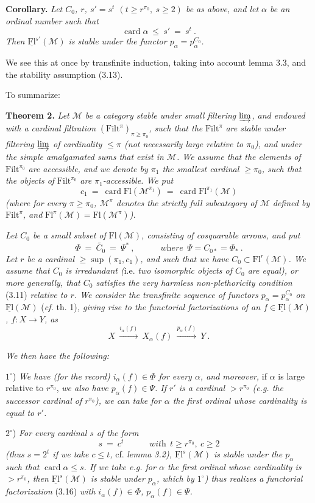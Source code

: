 \documentclass[11pt]{article}
\newcommand{\msp}[1]{\marginpar{\footnotesize [#1]}}
\newcommand{\M}{\mathcal{M}}
\newcommand{\Filt}{\mathrm{Filt}}
\newcommand{\Fl}{\mathrm{Fl}}
\newcommand{\uFl}{\underline{\mathrm{Fl}}}
\newcommand{\card}{\operatorname{card}}
\begin{document}
\textbf{Corollary.} \textit{Let $C_0$, $r$, $s'=s^t$ $(t\geq r^{\pi_0},\ s\geq 2)$ be as above, and let $\alpha$ be an ordinal number such that}
\[
\card\alpha\ \leq\ s'\ =\ s^t\ .
\]
\textit{Then $\uFl^{s'}(\M)$ is stable under the functor $p_\alpha=p_\alpha^{C_0}$.}

We see this at once by transfinite induction, taking into account lemma 3.3, and the stability assumption (3.13).

To summarize:

\textbf{Theorem 2.} \textit{Let $\M$ be a category stable under small filtering $\varinjlim$, and endowed with a cardinal filtration} $(\Filt^\pi)_{\pi\geq\pi_0}$\textit{, such that the} $\Filt^\pi$ \textit{are stable under filtering $\varinjlim$ of cardinality $\leq\pi$ (not necessarily large relative to $\pi_0$), and under the simple amalgamated sums that exist in $\M$. We assume that the elements of} $\Filt^{\pi_0}$ \textit{are accessible, and we denote by $\pi_1$ the smallest cardinal $\geq\pi_0$, such that the objects of} $\Filt^{\pi_0}$ \textit{are $\pi_1$-accessible. We put} \msp{page 27}
\[
c_1\ =\ \card\Fl(\M^{\pi_1})\ =\ \card\Fl^{\pi_1}(\M)
\]
\textit{(where for every $\pi\geq\pi_0$, $\M^\pi$ denotes the strictly full subcategory of $\M$ defined by} $\Filt^\pi$\textit{, and} $\Fl^\pi(\M)=\Fl(\M^\pi)$\textit{).}

\textit{Let $C_0$ be a small subset of} $\Fl(\M)$\textit{, consisting of cosquarable arrows, and put}
\[
\Phi\ =\ \widetilde{C_0}\ =\ \Psi^*\ ,\qquad\quad\textit{where}\ \ \Psi=C_{0*}=\Phi_*\ .
\]
\textit{Let $r$ be a cardinal} $\geq\sup(\pi_1,c_1)$\textit{, and such that we have $C_0\subset\Fl^r(\M)$. We assume that $C_0$ is irredundant (}i.e.\textit{ two isomorphic objects of $C_0$ are equal), or more generally, that $C_0$ satisfies the very harmless non-plethoricity condition} \textup{(3.11)} \textit{relative to $r$. We consider the transfinite sequence of functors $p_\alpha=p_\alpha^{C_0}$ on $\uFl(\M)$} \textup{(}\textit{cf.} \textup{th. 1)}\textit{, giving rise to the functorial factorizations of an $f\in\uFl(\M)$, $f:X\longrightarrow Y$, as}
\[
X\ \xrightarrow{i_\alpha(f)}\ X_\alpha(f)\ \xrightarrow{p_\alpha(f)}\ Y\ . \tag*{(3.16)}
\]

\textit{We then have the following:}

$1^\circ$) \textit{We have (for the record) $i_\alpha(f)\in\Phi$ for every $\alpha$, and moreover,} if $\alpha$ is large relative to $r^{\pi_0}$, \textit{we also have $p_\alpha(f)\in\Psi$. If $r'$ is a cardinal $>r^{\pi_0}$ (e.g. the successor cardinal of $r^{\pi_0}$), we can take for $\alpha$ the first ordinal whose cardinality is equal to $r'$.}

$2^\circ$) \textit{For every cardinal $s$ of the form}
\[
s\ =\ c^t\qquad\quad\textit{with}\ \ t\geq r^{\pi_0},\ c\geq 2
\]
\textit{(thus $s=2^t$ if we take $c\leq t$,} cf. \textit{lemma 3.2), $\uFl^s(\M)$ is stable under the $p_\alpha$ such that} $\card\alpha\leq s$\textit{. If we take e.g. for $\alpha$ the first ordinal whose cardinality is $>r^{\pi_0}$, then $\uFl^s(\M)$ is stable under $p_\alpha$, which by $1^\circ$) thus realizes a functorial factorization} \textup{(3.16)} \textit{with $i_\alpha(f)\in\Phi$, $p_\alpha(f)\in\Psi$.}
\end{document}
